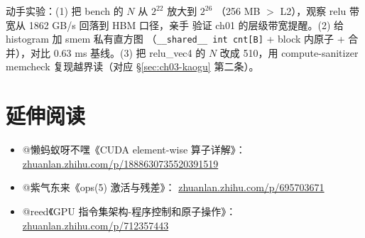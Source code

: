 动手实验：(1) 把 bench 的 $N$ 从 $2^{22}$ 放大到 $2^{26}$
（256 MB $>$ L2），观察 relu 带宽从 1862 GB/s 回落到 HBM 口径，亲手
验证 ch01 的层级带宽提醒。(2) 给 histogram 加 smem 私有直方图
（\texttt{\_\_shared\_\_ int cnt[B]} + block 内原子 + 合并），对比
0.63 ms 基线。(3) 把 relu\_vec4 的 $N$ 改成 510，用 compute-sanitizer
memcheck 复现越界读（对应 \S\ref{sec:ch03-kaogu} 第二条）。

\section*{延伸阅读}
\begin{itemize}
\item @懒蚂蚁呀不嘿《CUDA element-wise 算子详解》：
  \href{https://zhuanlan.zhihu.com/p/1888630735520391519}{zhuanlan.zhihu.com/p/1888630735520391519}
\item @紫气东来《ops(5) 激活与残差》：
  \href{https://zhuanlan.zhihu.com/p/695703671}{zhuanlan.zhihu.com/p/695703671}
\item @reed《GPU 指令集架构-程序控制和原子操作》：
  \href{https://zhuanlan.zhihu.com/p/712357443}{zhuanlan.zhihu.com/p/712357443}
\end{itemize}
